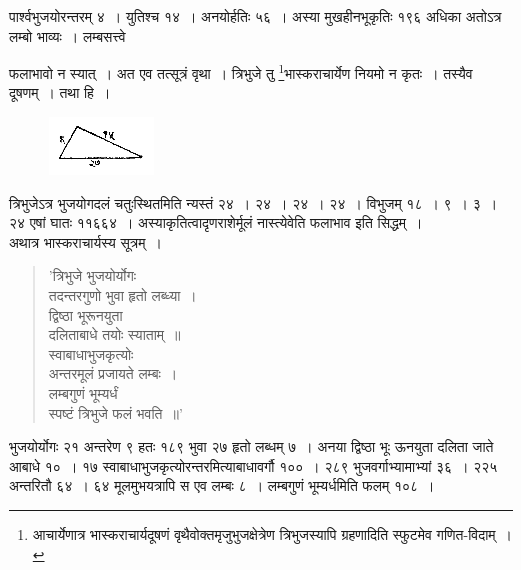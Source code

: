 \documentclass[11pt, openany]{book}
\begin{document}
 पार्श्वभुजयोरन्तरम् ४~। युतिश्च १४~। अनयोर्हतिः ५६~। अस्या
मुखहीनभूकृतिः १९६ अधिका अतोऽत्र लम्बो भाव्यः~। लम्बसत्त्वे

\newpage
\noindent फलाभावो न स्यात्~। अत एव तत्सूत्रं वृथा~। त्रिभुजे तु \renewcommand{\thefootnote}{\fnsymbol{footnote}}\footnote[1]{आचार्येणात्र भास्कराचार्यदूषणं वृथैवोक्तमृजुभुजक्षेत्रेण त्रिभुजस्यापि ग्रहणादिति स्फुटमेव गणित-विदाम्~।}भास्कराचार्येण नियमो न कृतः~। तस्यैव दूषणम्~। तथा हि~। 
\vspace{-2mm}

\begin{figure}[h!]
    \centering
    \includegraphics[scale=0.85]{graphics/capture47.png}
\end{figure}
\vspace{-2mm}

\noindent त्रिभुजेऽत्र भुजयोगदलं चतुःस्थितमिति न्यस्तं २४~। २४~। २४~। २४~। विभुजम् १८~। ९~। ३~। २४ एषां घातः ११६६४~। अस्याकृतित्वादृणराशेर्मूलं नास्त्येवेति फलाभाव इति सिद्धम्~।\\

\vspace{-2mm}
 अथात्र {\color{violet}भास्कराचार्य}स्य सूत्रम्~। 
\begin{quote}
    \bq 
    'त्रिभुजे भुजयोर्योगः \\
    तदन्तरगुणो भुवा हृतो लब्ध्या~।\\
द्विष्ठा भूरूनयुता \\
दलिताबाधे तयोः स्याताम्~॥\\
स्वाबाधाभुजकृत्योः\\
अन्तरमूलं प्रजायते लम्बः~।\\
लम्बगुणं भूम्यर्धं \\
स्पष्टं त्रिभुजे फलं भवति~॥'
\end{quote}
\newpage%

 भुजयोर्योगः २१ अन्तरेण ९ हतः १८९ भुवा २७ हृतो
लब्धम् ७~। अनया द्विष्ठा भूः ऊनयुता दलिता जाते आबाधे १०~। १७
स्वाबाधाभुजकृत्योरन्तरमित्याबाधावर्गौ १००~। २८९ भुजवर्गाभ्यामाभ्यां ३६~। २२५ अन्तरितौ ६४~। ६४ मूलमुभयत्रापि स एव लम्बः
८~। लम्बगुणं भूम्यर्धमिति फलम् १०८~। \\
\end{document}
